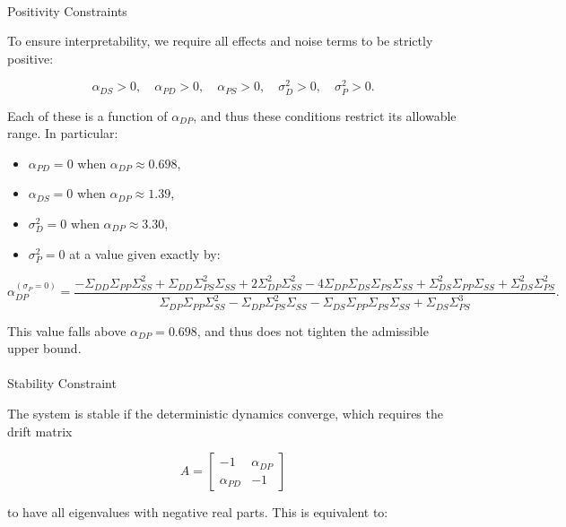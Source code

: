 \documentclass[
]{article}
\makeatletter
\let\oldparagraph\paragraph
\renewcommand{\paragraph}{
    \@ifstar
      \xxxParagraphStar
      \xxxParagraphNoStar
  }
\newcommand{\xxxParagraphStar}[1]{\oldparagraph*{#1}\mbox{}}
\newcommand{\xxxParagraphNoStar}[1]{\oldparagraph{#1}\mbox{}}
\providecommand{\tightlist}{%
  \setlength{\itemsep}{0pt}\setlength{\parskip}{0pt}}\usepackage{longtable,booktabs,array}
\makeatother
\begin{document}
\paragraph{Positivity Constraints}\label{positivity-constraints}

To ensure interpretability, we require all effects and noise terms to be
strictly positive:

\[
\alpha_{DS} > 0, \quad \alpha_{PD} > 0, \quad \alpha_{PS} > 0, \quad \sigma_D^2 > 0, \quad \sigma_P^2 > 0.
\]

Each of these is a function of \(\alpha_{DP}\), and thus these
conditions restrict its allowable range. In particular:

\begin{itemize}
\tightlist
\item
  \(\alpha_{PD} = 0\) when \(\alpha_{DP} \approx 0.698\),
\item
  \(\alpha_{DS} = 0\) when \(\alpha_{DP} \approx 1.39\),
\item
  \(\sigma_D^2 = 0\) when \(\alpha_{DP} \approx 3.30\),
\item
  \(\sigma_P^2 = 0\) at a value given exactly by:
\end{itemize}

\[
\alpha_{DP}^{(\sigma_P = 0)} =
\frac{
- \Sigma_{DD} \Sigma_{PP} \Sigma_{SS}^2 + \Sigma_{DD} \Sigma_{PS}^2 \Sigma_{SS}
+ 2 \Sigma_{DP}^2 \Sigma_{SS}^2 - 4 \Sigma_{DP} \Sigma_{DS} \Sigma_{PS} \Sigma_{SS}
+ \Sigma_{DS}^2 \Sigma_{PP} \Sigma_{SS} + \Sigma_{DS}^2 \Sigma_{PS}^2
}{
\Sigma_{DP} \Sigma_{PP} \Sigma_{SS}^2 - \Sigma_{DP} \Sigma_{PS}^2 \Sigma_{SS}
- \Sigma_{DS} \Sigma_{PP} \Sigma_{PS} \Sigma_{SS} + \Sigma_{DS} \Sigma_{PS}^3
}.
\]

This value falls above \(\alpha_{DP} = 0.698\), and thus does not
tighten the admissible upper bound.

\paragraph{Stability Constraint}\label{stability-constraint}

The system is stable if the deterministic dynamics converge, which
requires the drift matrix

\[
A = \begin{bmatrix}
-1 & \alpha_{DP} \\
\alpha_{PD} & -1
\end{bmatrix}
\]

to have all eigenvalues with negative real parts. This is equivalent to:
\end{document}
